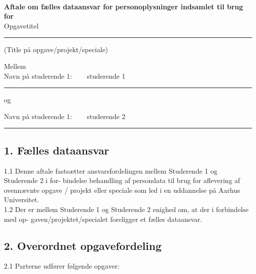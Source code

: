 \documentclass[11pt, a4paper]{article}
\newcommand{\opgavetitel}{ Opgavetitel }	 				%
\newcommand{\studerendeET}{ studerende 1 }	 			%
\newcommand{\studerendeTO}{ studerende 2 }	 			%
\begin{document}
\pagestyle{fancy}
~
\vspace{1cm}

\textbf{Aftale om fælles dataansvar for personoplysninger indsamlet til brug for}~\\



\opgavetitel
\hrule
\vspace{2mm}
(Title på opgave/projekt/speciale)

\vspace{5mm}


Mellem\\ 

Navn på studerende 1: ~~~\studerendeET
\vspace{1mm}
\hrule

\vspace{5mm}

og 
\vspace{5mm}

Navn på studerende 1: ~~~\studerendeTO
\vspace{1mm}
\hrule

\vspace{5mm}


\newpage
\subsection*{1. Fælles dataansvar}

1.1 Denne aftale fastsætter ansvarsfordelingen mellem Studerende 1 og Studerende 2 i for- bindelse behandling af persondata til brug for aflevering af ovennævnte opgave / projekt eller speciale som led i en uddannelse på Aarhus Universitet.\\

1.2 Der er mellem Studerende 1 og Studerende 2 enighed om, at der i forbindelse med op- gaven/projektet/specialet foreligger et fælles dataansvar.

\subsection*{2. Overordnet opgavefordeling}

2.1 Parterne udfører følgende opgaver: 
\end{document}
